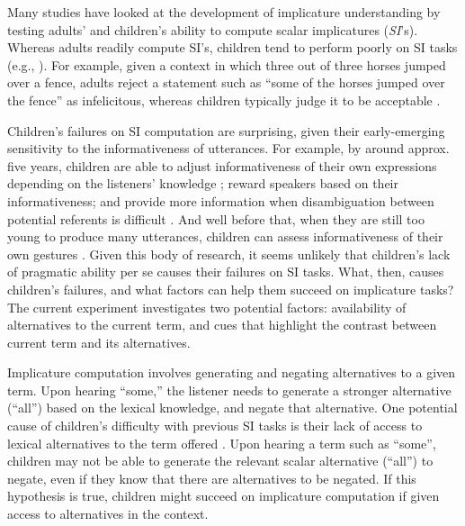 \documentclass[10pt,letterpaper]{article}
\begin{document}
Many studies have looked at the development of implicature understanding by testing adults' and children's ability to compute scalar implicatures (\emph{SI}'s). Whereas adults readily compute SI's, children tend to perform poorly on SI tasks (e.g., ). For example, given a context in which three out of three horses jumped over a fence, adults reject a statement such as ``some of the horses jumped over the fence'' as infelicitous, whereas children typically judge it to be acceptable \cite{papafragou2003scalar}. 

Children's failures on SI computation are surprising, given their early-emerging sensitivity to the informativeness of utterances. For example, by around approx. five years, children are able to adjust informativeness of their own expressions depending on the listeners' knowledge \cite{matthews2006effect}; reward speakers based on their informativeness\cite{katsos2011pragmatic}; and provide more information when disambiguation between potential referents is difficult \cite{matthews2012two}. And well before that, when they are still too young to produce many utterances, children can assess informativeness of their own gestures \cite{o2001two}. Given this body of research, it seems unlikely that children's lack of pragmatic ability per se causes their failures on SI tasks. What, then, causes children's failures, and what factors can help them succeed on implicature tasks? The current experiment investigates two potential factors: availability of alternatives to the current term, and cues that highlight the contrast between current term and its alternatives.

Implicature computation involves generating and negating alternatives to a given term. Upon hearing ``some,'' the listener needs to generate a stronger alternative (``all'') based on the lexical knowledge, and negate that alternative. One potential cause of children's difficulty with previous SI tasks is their lack of access to lexical alternatives to the term offered \cite{barner2011accessing}. Upon hearing a term such as ``some'', children may not be able to generate the relevant scalar alternative (``all'') to negate, even if they know that there are alternatives to be negated. If this hypothesis is true, children might succeed on implicature computation if given access to alternatives in the context.
\end{document}
